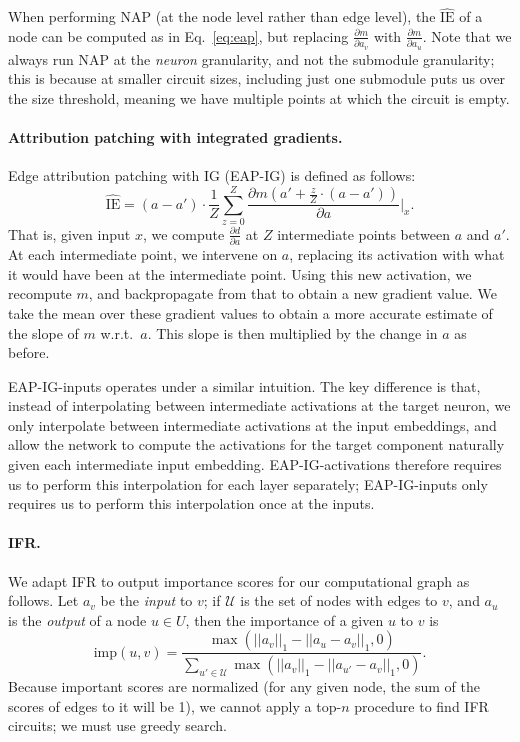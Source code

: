 \documentclass{article}
\theoremstyle{plain}
\theoremstyle{definition}
\theoremstyle{remark}
\newcommand{\ho}[2][]{\todo[color=magenta!20, #1]{\textbf{HO:} #2}}
\begin{document}
When performing NAP (at the node level rather than edge level), the $\hat{\text{IE}}$ of a node can be computed as in Eq.~\ref{eq:eap}, but replacing $\frac{\partial m}{\partial a_v}$ with $\frac{\partial m}{\partial a_u}$. Note that we always run NAP at the \emph{neuron} granularity, and not the submodule granularity; this is because at smaller circuit sizes, including just one submodule puts us over the size threshold, meaning we have multiple points at which the circuit is empty.

\paragraph{Attribution patching with integrated gradients.}\label{app:eap-ig}
Edge attribution patching with IG (EAP-IG) is defined as follows: \ho{missing EAP-IG-inputs definition}
\begin{equation}
    \hat{\text{IE}} = (a-a') \cdot \frac{1}{Z}\sum_{z=0}^Z \frac{\partial m(a' + \frac{z}{Z}\cdot (a - a'))}{\partial a}\Big|_x.
    \label{eq:atp-ig}
\end{equation}
That is, given input $x$, we compute $\frac{\partial d}{\partial a}$ at $Z$ intermediate points between $a$ and $a'$. At each intermediate point, we intervene on $a$, replacing its activation with what it would have been at the intermediate point. Using this new activation, we recompute $m$, and backpropagate from that to obtain a new gradient value. We take the mean over these gradient values to obtain a more accurate estimate of the slope of $m$ w.r.t.\ $a$. This slope is then multiplied by the change in $a$ as before.

EAP-IG-inputs operates under a similar intuition. The key difference is that, instead of interpolating between intermediate activations at the target neuron, we only interpolate between intermediate activations at the input embeddings, and allow the network to compute the activations for the target component naturally given each intermediate input embedding. EAP-IG-activations therefore requires us to perform this interpolation for each layer separately; EAP-IG-inputs only requires us to perform this interpolation once at the inputs.

\paragraph{IFR.}\label{app:ifr}
We adapt IFR to output importance scores for our computational graph as follows. Let $a_{v}$ be the \emph{input} to $v$; if $\mathcal{U}$ is the set of nodes with edges to $v$, and $a_{u}$ is the \emph{output} of a node $u\in U$, then the importance of a given $u$ to $v$ is 
\begin{equation}
    \text{imp}(u,v) = \frac{\max(||a_{v}||_{1}-||a_{u} -a_{v}||_{1}, 0)}{\sum_{u'\in\mathcal{U}}\max(||a_{v}||_{1}-||a_{u'} - a_{v}||_{1}, 0)}.
\end{equation}
Because important scores are normalized (for any given node, the sum of the scores of edges to it will be 1), we cannot apply a top-$n$ procedure to find IFR circuits; we must use greedy search.
\end{document}
